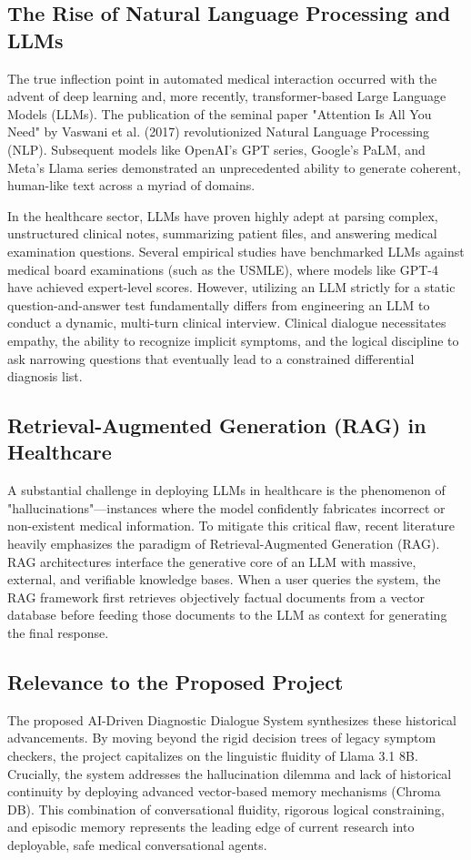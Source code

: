 \documentclass[12pt]{article}
\begin{document}
\subsection{The Rise of Natural Language Processing and LLMs}
The true inflection point in automated medical interaction occurred with the advent of deep learning and, more recently, transformer-based Large Language Models (LLMs). The publication of the seminal paper "Attention Is All You Need" by Vaswani et al. (2017) revolutionized Natural Language Processing (NLP). Subsequent models like OpenAI’s GPT series, Google’s PaLM, and Meta's Llama series demonstrated an unprecedented ability to generate coherent, human-like text across a myriad of domains.

In the healthcare sector, LLMs have proven highly adept at parsing complex, unstructured clinical notes, summarizing patient files, and answering medical examination questions. Several empirical studies have benchmarked LLMs against medical board examinations (such as the USMLE), where models like GPT-4 have achieved expert-level scores. However, utilizing an LLM strictly for a static question-and-answer test fundamentally differs from engineering an LLM to conduct a dynamic, multi-turn clinical interview. Clinical dialogue necessitates empathy, the ability to recognize implicit symptoms, and the logical discipline to ask narrowing questions that eventually lead to a constrained differential diagnosis list. 

\subsection{Retrieval-Augmented Generation (RAG) in Healthcare}
A substantial challenge in deploying LLMs in healthcare is the phenomenon of "hallucinations"—instances where the model confidently fabricates incorrect or non-existent medical information. To mitigate this critical flaw, recent literature heavily emphasizes the paradigm of Retrieval-Augmented Generation (RAG). RAG architectures interface the generative core of an LLM with massive, external, and verifiable knowledge bases. When a user queries the system, the RAG framework first retrieves objectively factual documents from a vector database before feeding those documents to the LLM as context for generating the final response.

\subsection{Relevance to the Proposed Project}
The proposed AI-Driven Diagnostic Dialogue System synthesizes these historical advancements. By moving beyond the rigid decision trees of legacy symptom checkers, the project capitalizes on the linguistic fluidity of Llama 3.1 8B. Crucially, the system addresses the hallucination dilemma and lack of historical continuity by deploying advanced vector-based memory mechanisms (Chroma DB). This combination of conversational fluidity, rigorous logical constraining, and episodic memory represents the leading edge of current research into deployable, safe medical conversational agents.
\end{document}
